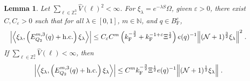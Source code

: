 \documentclass[12pt,a4paper]{article}
\numberwithin{equation}{section}
\newcommand{\NNN}{\mathbb{N}}
\newcommand{\1}{\mathbb{I}}
\newcommand{\F}{\mathrm{F}}
\newcommand{\Z}{\mathbb{Z}}
\newcommand{\NN}{\mathcal{N}}
\newcommand{\half}{\frac{1}{2}}
\newcommand{\eva}[1]{\left\langle #1 \right\rangle}
\theoremstyle{plain}
\newtheorem{lemma}[theorem]{Lemma}
\theoremstyle{definition}
\theoremstyle{remark}
\theoremstyle{plain}
\theoremstyle{definition}
\theoremstyle{remark}
\begin{document}
\begin{lemma} \label{lem:EQ215}
Let $ \sum_{\ell \in \Z^3_*} \hat{V}(\ell)^2 < \infty $. For $\xi_\lambda = e^{-\lambda S} \Omega$, given $ \varepsilon > 0 $, there exist $ C, C_\varepsilon > 0 $ such that for all $ \lambda \in [0,1] $, $ m \in \NNN $, and $ q \in B_{\F}^c $,
\begin{align} \label{eq:estEQ215_Coulomb}
	\abs{\eva{\xi_\lambda,\left(E^{m,3}_{Q_2}(q) +\mathrm{h.c.}\right) \xi_\lambda }}
	\leq C_\varepsilon C^m \left( k_{\F}^{-\frac 32}
		+ k_{\F}^{-1 + \varepsilon} \Xi^\half \right)
		e(q)^{-1}
		\norm{(\NN+1)^{\frac 32} \xi_\lambda }^2 \;.
\end{align}
If $ \sum_{\ell \in \Z^3_*} \hat{V}(\ell) < \infty $, then
\begin{align} \label{eq:estEQ215}
	\abs{\eva{\xi_\lambda,\left(E^{m,3}_{Q_2}(q) + \mathrm{h.c.}\right) \xi_\lambda }}
	\leq C^m k_{\F}^{-\frac{3}{2}} \Xi^{\half} e(q)^{-1}
		\norm{(\NN+1)^\half \xi_\lambda } \;.
\end{align}
\end{lemma}
\end{document}
